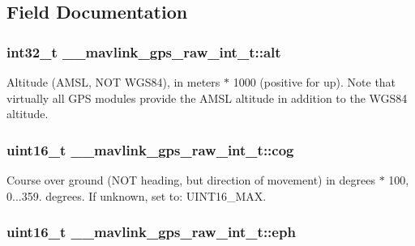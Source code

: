 \subsection{Field Documentation}
\hypertarget{struct____mavlink__gps__raw__int__t_a00fe92144cfdaf8440a841493e5b6e99}{
\subsubsection[{alt}]{\setlength{\rightskip}{0pt plus 5cm}int32\+\_\+t \+\_\+\+\_\+mavlink\+\_\+gps\+\_\+raw\+\_\+int\+\_\+t\+::alt}}\label{struct____mavlink__gps__raw__int__t_a00fe92144cfdaf8440a841493e5b6e99}


Altitude (A\+M\+S\+L, N\+O\+T W\+G\+S84), in meters $\ast$ 1000 (positive for up). Note that virtually all G\+P\+S modules provide the A\+M\+S\+L altitude in addition to the W\+G\+S84 altitude. 

\hypertarget{struct____mavlink__gps__raw__int__t_adbe4dfbea17d1fd08a0841ce29e32637}{
\subsubsection[{cog}]{\setlength{\rightskip}{0pt plus 5cm}uint16\+\_\+t \+\_\+\+\_\+mavlink\+\_\+gps\+\_\+raw\+\_\+int\+\_\+t\+::cog}}\label{struct____mavlink__gps__raw__int__t_adbe4dfbea17d1fd08a0841ce29e32637}


Course over ground (N\+O\+T heading, but direction of movement) in degrees $\ast$ 100, 0...359. degrees. If unknown, set to\+: U\+I\+N\+T16\+\_\+\+M\+A\+X. 

\hypertarget{struct____mavlink__gps__raw__int__t_ad7ec0749ffe37d3ada65b701be2cd305}{
\subsubsection[{eph}]{\setlength{\rightskip}{0pt plus 5cm}uint16\+\_\+t \+\_\+\+\_\+mavlink\+\_\+gps\+\_\+raw\+\_\+int\+\_\+t\+::eph}}\label{struct____mavlink__gps__raw__int__t_ad7ec0749ffe37d3ada65b701be2cd305}



